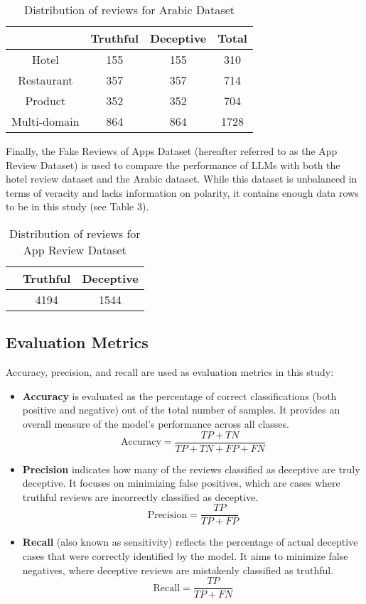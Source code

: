 \documentclass[sigconf, nonacm]{acmart}
\theoremstyle{definition}
\begin{document}
\begin{table}[h!]
  \centering
  \caption{Distribution of reviews for Arabic Dataset}
  \begin{tabular}{c c c c}
    \toprule
                 & Truthful & Deceptive & Total \\
    \midrule
    Hotel        & 155      & 155       & 310   \\
    Restaurant   & 357      & 357       & 714   \\
    Product      & 352      & 352       & 704   \\
    Multi-domain & 864      & 864       & 1728  \\
    \bottomrule
  \end{tabular}
\end{table}

Finally, the Fake Reviews of Apps Dataset (hereafter referred to as the App Review Dataset) is used to compare the performance of LLMs with both the hotel review dataset and the Arabic dataset. While this dataset is unbalanced in terms of veracity and lacks information on polarity, it contains enough data rows to be  in this study (see Table 3).

\begin{table}[h!]
  \centering
  \caption{Distribution of reviews for App Review Dataset}
  \begin{tabular}{c c c}
    \toprule
     & Truthful & Deceptive \\
    \midrule
     & 4194     & 1544      \\
    \bottomrule
  \end{tabular}
\end{table}

\subsection{Evaluation Metrics}
Accuracy, precision, and recall are used as evaluation metrics in this study:

\begin{itemize}
  \item \textbf{Accuracy} is evaluated as the percentage of correct classifications (both positive and negative) out of the total number of samples. It provides an overall measure of the model's performance across all classes.
        \[
          \text{Accuracy} = \frac{TP + TN}{TP + TN + FP + FN}
        \]
  \item \textbf{Precision} indicates how many of the reviews classified as deceptive are truly deceptive. It focuses on minimizing false positives, which are cases where truthful reviews are incorrectly classified as deceptive.
        \[
          \text{Precision} = \frac{TP}{TP + FP}
        \]
  \item \textbf{Recall} (also known as sensitivity) reflects the percentage of actual deceptive cases that were correctly identified by the model. It aims to minimize false negatives, where deceptive reviews are mistakenly classified as truthful.
        \[
          \text{Recall} = \frac{TP}{TP + FN}
        \]
\end{itemize}
\end{document}
